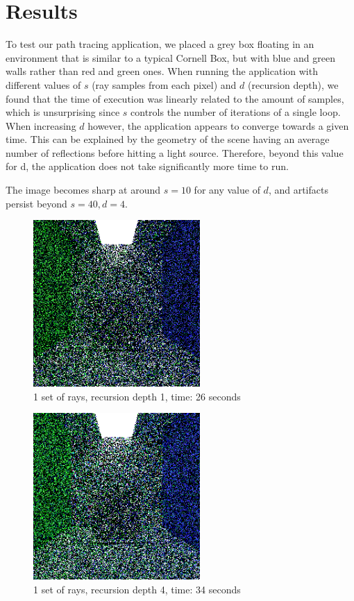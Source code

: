 \documentclass[journal]{IEEEtran}
\begin{document}
\section{Results}

To test our path tracing application, we placed a grey box floating in an environment that is similar to a typical Cornell Box, but with blue and green walls rather than red and green ones. When running the application with different values of $s$ (ray samples from each pixel) and $d$ (recursion depth), we found that the time of execution was linearly related to the amount of samples, which is unsurprising since $s$ controls the number of iterations of a single loop. When increasing $d$ however, the application appears to converge towards a given time. This can be explained by the geometry of the scene having an average number of reflections before hitting a light source. Therefore, beyond this value for d, the application does not take significantly more time to run.

\par
The image becomes sharp at around $s=10$ for any value of $d$, and artifacts persist beyond $s=40, d=4$.

\begin{figure}[!t]

\centering
\includegraphics[width=2.5in]{1s_1d_26s}
\caption{1 set of rays, recursion depth 1, time: 26 seconds}
\label{1s_1d_26s}

\end{figure}

\begin{figure}[!t]

\centering
\includegraphics[width=2.5in]{1s_4d_34s}
\caption{1 set of rays, recursion depth 4, time: 34 seconds}
\label{1s_4d_34s}

\end{figure}
\end{document}
